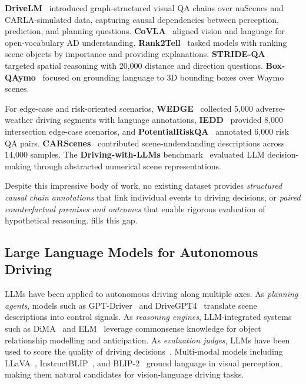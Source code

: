 \textbf{DriveLM}~\cite{sima2023drivelm} introduced graph-structured visual QA
chains over nuScenes and CARLA-simulated data, capturing causal dependencies
between perception, prediction, and planning questions. \textbf{CoVLA}~\cite{covla2024}
aligned vision and language for open-vocabulary AD understanding. \textbf{Rank2Tell}~\cite{rank2tell2024}
tasked models with ranking scene objects by importance and providing explanations.
\textbf{STRIDE-QA}~\cite{wu2024stride} targeted spatial reasoning with 20,000
distance and direction questions. \textbf{Box-QAymo}~\cite{boxqaymo2024} focused
on grounding language to 3D bounding boxes over Waymo scenes.

For edge-case and risk-oriented scenarios, \textbf{WEDGE}~\cite{wedge2024} collected
5,000 adverse-weather driving segments with language annotations,
\textbf{IEDD}~\cite{iedd2024} provided 8,000 intersection edge-case scenarios, and
\textbf{PotentialRiskQA}~\cite{potentialrisk2024} annotated 6,000 risk QA pairs.
\textbf{CARScenes}~\cite{carscenes2024} contributed scene-understanding descriptions
across 14,000 samples. The \textbf{Driving-with-LLMs} benchmark~\cite{drivingwithllms2024}
evaluated LLM decision-making through abstracted numerical scene representations.

Despite this impressive body of work, no existing dataset provides \emph{structured
causal chain annotations} that link individual events to driving decisions, or
\emph{paired counterfactual premises and outcomes} that enable rigorous evaluation of
hypothetical reasoning. \lucid{} fills this gap.

\subsection{Large Language Models for Autonomous Driving}
\label{ssec:rw_llm}

LLMs have been applied to autonomous driving along multiple axes. As \emph{planning
agents}, models such as GPT-Driver~\cite{mao2023gptdriver} and DriveGPT4~\cite{xu2023drivegpt4}
translate scene descriptions into control signals. As \emph{reasoning engines},
LLM-integrated systems such as DiMA~\cite{ding2023dima} and ELM~\cite{zhou2024elm}
leverage commonsense knowledge for object relationship modelling and anticipation.
As \emph{evaluation judges}, LLMs have been used to score the quality of
driving decisions~\cite{drivingwithllms2024}. Multi-modal models including
LLaVA~\cite{liu2023visual}, InstructBLIP~\cite{dai2023instructblip}, and
BLIP-2~\cite{li2023blip2} ground language in visual perception, making them
natural candidates for vision-language driving tasks.

